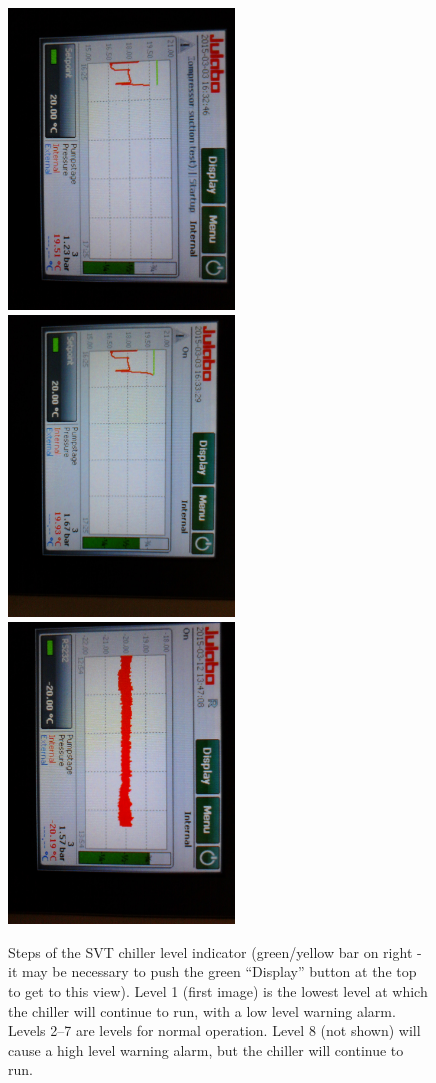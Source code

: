 \begin{figure}
    \includegraphics[angle=90,width=6cm]{figures/chiller_level5}
    \includegraphics[angle=90,width=6cm]{figures/chiller_level6}
    \includegraphics[angle=90,width=6cm]{figures/chiller_level7}
    \caption{Steps of the SVT chiller level indicator (green/yellow bar on right - it may be necessary to push the green ``Display'' button at the top to get to this view). Level 1 (first image) is the lowest level at which the chiller will continue to run, with a low level warning alarm. Levels 2--7 are levels for normal operation. Level 8 (not shown) will cause a high level warning alarm, but the chiller will continue to run. \label{fig:svt_chiller_level}}
\end{figure}

